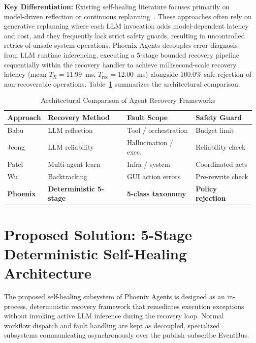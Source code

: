 \documentclass[conference]{IEEEtran}
\newcommand{\chg}[1]{{\color{blue}#1}}
\begin{document}
\textbf{Key Differentiation:} Existing self-healing literature focuses primarily on model-driven reflection or continuous replanning~\cite{babu2026,jeong2026,patel2026a}. These approaches often rely on generative replanning where each LLM invocation adds model-dependent latency and cost, and they frequently lack strict safety guards, resulting in uncontrolled retries of unsafe system operations. Phoenix Agents decouples error diagnosis from LLM runtime inferencing, executing a 5-stage bounded recovery pipeline sequentially within the recovery handler to achieve millisecond-scale recovery latency (\chg{mean $T_R = 11.99$~ms, $T_{\text{rec}} = 12.00$~ms}) alongside 100.0\% safe rejection of non-recoverable operations. Table~\ref{tab:comparison} summarizes the architectural comparison.

\begin{table}[t]
\centering
\caption{\chg{Architectural Comparison of Agent Recovery Frameworks}}
\label{tab:comparison}
\footnotesize
\setlength{\tabcolsep}{2pt}
\begin{tabularx}{\columnwidth}{p{}p{}p{}X}
\toprule
\chg{\textbf{Approach}} & \chg{\textbf{Recovery Method}} & \chg{\textbf{Fault Scope}} & \chg{\textbf{Safety Guard}} \\
\midrule
\chg{Babu~\cite{babu2026}} & \chg{LLM reflection} & \chg{Tool / orchestration} & \chg{Budget limit} \\
\chg{Jeong~\cite{jeong2026}} & \chg{LLM reliability} & \chg{Hallucination / exec.} & \chg{Reliability check} \\
\chg{Patel~\cite{patel2026b}} & \chg{Multi-agent learn} & \chg{Infra / system} & \chg{Coordinated acts} \\
\chg{Wu~\cite{wu2025}} & \chg{Backtracking} & \chg{GUI action errors} & \chg{Pre-rewrite check} \\
\chg{\textbf{Phoenix}} & \chg{\textbf{Deterministic 5-stage}} & \chg{\textbf{5-class taxonomy}} & \chg{\textbf{Policy rejection}} \\
\bottomrule
\end{tabularx}
\end{table}

\section{Proposed Solution: 5-Stage Deterministic Self-Healing Architecture}
The proposed self-healing subsystem of Phoenix Agents is designed as an in-process, deterministic recovery framework that remediates execution exceptions without invoking active LLM inference during the recovery loop. Normal workflow dispatch and fault handling are kept as decoupled, specialized subsystems communicating asynchronously over the publish--subscribe EventBus.
\end{document}
